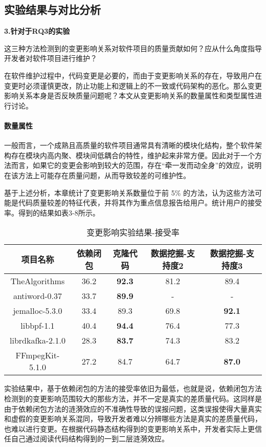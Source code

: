\subsection{实验结果与对比分析}




\textbf{3.针对于RQ3的实验}

这三种方法检测到的变更影响关系对软件项目的质量贡献如何？应从什么角度指导开发者对软件项目进行维护？

在软件维护过程中，代码变更是必要的，而由于变更影响关系的存在，导致用户在变更时必须谨慎更改，防止功能上和逻辑上的不一致或代码架构的恶化。那么变更影响关系本身是否反映质量问题呢？本文从变更影响关系的数量属性和类型属性进行讨论。

\paragraph{数量属性} 一般而言，一个成熟且高质量的软件项目通常具有清晰的模块化结构，整个软件架构存在模块内高内聚、模块间低耦合的特性，维护起来非常方便。因此对于一个方法而言，如果它的变更会影响到较大的范围，存在“牵一发而动全身”的效应，说明在该方法上可能存在质量问题，从而导致较差的可维护性。

基于上述分析，本章统计了变更影响关系数量位于前 5\% 的方法，认为这些方法可能是代码质量较差的特征代表，并将其作为重点信息报告给用户。统计用户的接受率。得到的结果如表3-8所示。

\begin{table}[htbp]
\caption{变更影响实验结果-接受率}
\vspace{0.5em}\centering\wuhao
\begin{tabular}{ccccc}
\toprule
项目名称 & 依赖闭包 & 克隆代码 & 数据挖掘-支持度2 & 数据挖掘-支持度3 \\
\midrule
TheAlgorithms & 36.2 & \textbf{92.3} & 81.2 & 89.4\\
antiword-0.37 & 33.7 & \textbf{89.9} & - & -\\
jemalloc-5.3.0 & 33.4 & 89.3 & 69.8 & \textbf{92.1}\\
libbpf-1.1 & 40.4 & \textbf{94.4} & 76.4 & 77.3\\
librdkafka-2.1.0 & 28.3 & \textbf{83.7} & 74.3 & 83.2\\
FFmpegKit-5.1.0 & 27.2 & 84.7 & 64.7 & \textbf{87.0}\\

\bottomrule
\end{tabular}
\end{table}

实验结果中，基于依赖闭包的方法的接受率依旧为最低，也就是说，依赖闭包方法检测到的变更影响范围较大的那些方法，并不一定是真实的差质量代码。这同样是由于依赖闭包方法的涟漪效应的不准确性导致的误报问题，这类误报使得大量真实和虚假的变更影响关系混同，导致开发者难以分辨哪些方法是真实的差质量代码，也难以进行变更。在根据代码静态结构得到的变更影响关系中，开发者实际上更信任自己通过阅读代码结构得到的一到二层涟漪效应。

